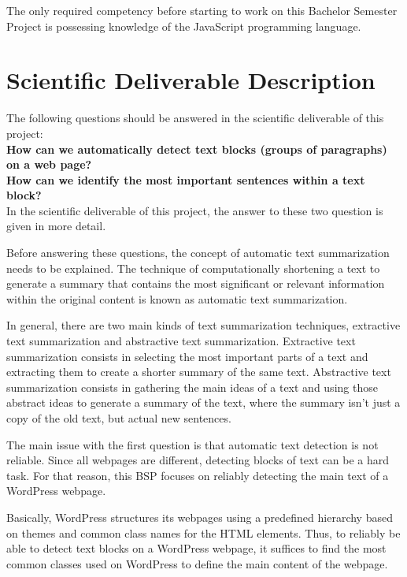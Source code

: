 \documentclass[conference,compsoc]{IEEEtran}
\begin{document}
The only required competency before starting to work on this Bachelor Semester Project is possessing knowledge of the JavaScript programming language.


\section{ Scientific Deliverable Description}
\label{sec-production}
The following questions should be answered in the scientific deliverable of this project:\\

\textbf{How can we automatically detect text blocks (groups of paragraphs) on a web page?}\\

\textbf{How can we identify the most important sentences within a text block?}\\

In the scientific deliverable of this project, the answer to these two question is given in more detail.

Before answering these questions, the concept of automatic text summarization needs to be explained. The technique of computationally shortening a text to generate a summary that contains the most significant or relevant information within the original content is known as automatic text summarization.

In general, there are two main kinds of text summarization techniques, extractive text summarization and abstractive text summarization. Extractive text summarization consists in selecting the most important parts of a text and extracting them to create a shorter summary of the same text. Abstractive text summarization consists in gathering the main ideas of a text and using those abstract ideas to generate a summary of the text, where the summary isn't just a copy of the old text, but actual new sentences.

The main issue with the first question is that automatic text detection is not reliable. Since all webpages are different, detecting blocks of text can be a hard task. For that reason, this BSP focuses on reliably detecting the main text of a WordPress webpage.

Basically, WordPress structures its webpages using a predefined hierarchy based on themes and common class names for the HTML elements. Thus, to reliably be able to detect text blocks on a WordPress webpage, it suffices to find the most common classes used on WordPress to define the main content of the webpage.
\end{document}
